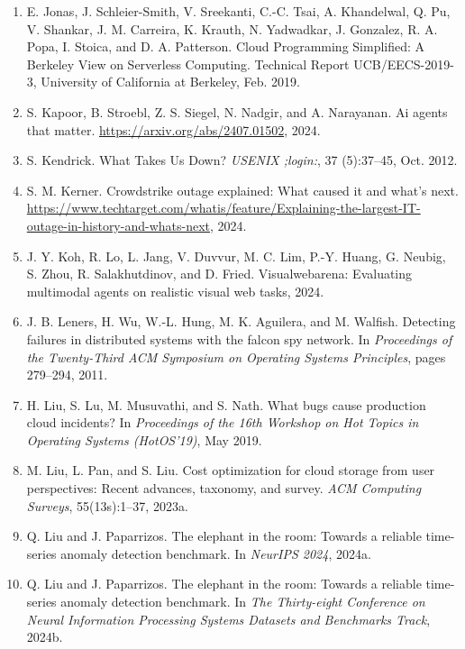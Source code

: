\begin{enumerate}[leftmargin=2em,itemsep=2pt]
\item E. Jonas, J. Schleier-Smith, V. Sreekanti, C.-C. Tsai, A. Khandelwal, Q. Pu, V. Shankar, J. M. Carreira, K. Krauth, N. Yadwadkar, J. Gonzalez, R. A. Popa, I. Stoica, and D. A. Patterson. Cloud Programming Simplified: A Berkeley View on Serverless Computing. Technical Report UCB/EECS-2019-3, University of California at Berkeley, Feb. 2019.

\item S. Kapoor, B. Stroebl, Z. S. Siegel, N. Nadgir, and A. Narayanan. Ai agents that matter. \url{https://arxiv.org/abs/2407.01502}, 2024.

\item S. Kendrick. What Takes Us Down? \textit{USENIX ;login:}, 37 (5):37--45, Oct. 2012.

\item S. M. Kerner. Crowdstrike outage explained: What caused it and what's next. \url{https://www.techtarget.com/whatis/feature/Explaining-the-largest-IT-outage-in-history-and-whats-next}, 2024.

\item J. Y. Koh, R. Lo, L. Jang, V. Duvvur, M. C. Lim, P.-Y. Huang, G. Neubig, S. Zhou, R. Salakhutdinov, and D. Fried. Visualwebarena: Evaluating multimodal agents on realistic visual web tasks, 2024.

\item J. B. Leners, H. Wu, W.-L. Hung, M. K. Aguilera, and M. Walfish. Detecting failures in distributed systems with the falcon spy network. In \textit{Proceedings of the Twenty-Third ACM Symposium on Operating Systems Principles}, pages 279--294, 2011.

\item H. Liu, S. Lu, M. Musuvathi, and S. Nath. What bugs cause production cloud incidents? In \textit{Proceedings of the 16th Workshop on Hot Topics in Operating Systems (HotOS'19)}, May 2019.

\item M. Liu, L. Pan, and S. Liu. Cost optimization for cloud storage from user perspectives: Recent advances, taxonomy, and survey. \textit{ACM Computing Surveys}, 55(13s):1--37, 2023a.

\item Q. Liu and J. Paparrizos. The elephant in the room: Towards a reliable time-series anomaly detection benchmark. In \textit{NeurIPS 2024}, 2024a.

\item Q. Liu and J. Paparrizos. The elephant in the room: Towards a reliable time-series anomaly detection benchmark. In \textit{The Thirty-eight Conference on Neural Information Processing Systems Datasets and Benchmarks Track}, 2024b.


\end{enumerate}
